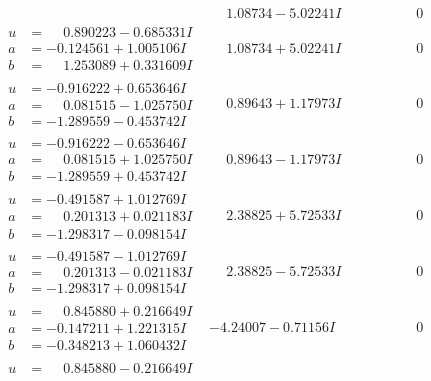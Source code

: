 \documentclass[1p]{elsarticle_modified}
\theoremstyle{definition}
\begin{document}
$$\begin{array}{c|c|c}
 & \phantom{-}1.08734 - 5.02241 I & \phantom{-0.000000 } 0 \\ \hline\begin{aligned}
u &= \phantom{-}0.890223 - 0.685331 I \\
a &= -0.124561 + 1.005106 I \\
b &= \phantom{-}1.253089 + 0.331609 I\end{aligned}
 & \phantom{-}1.08734 + 5.02241 I & \phantom{-0.000000 } 0 \\ \hline\begin{aligned}
u &= -0.916222 + 0.653646 I \\
a &= \phantom{-}0.081515 - 1.025750 I \\
b &= -1.289559 - 0.453742 I\end{aligned}
 & \phantom{-}0.89643 + 1.17973 I & \phantom{-0.000000 } 0 \\ \hline\begin{aligned}
u &= -0.916222 - 0.653646 I \\
a &= \phantom{-}0.081515 + 1.025750 I \\
b &= -1.289559 + 0.453742 I\end{aligned}
 & \phantom{-}0.89643 - 1.17973 I & \phantom{-0.000000 } 0 \\ \hline\begin{aligned}
u &= -0.491587 + 1.012769 I \\
a &= \phantom{-}0.201313 + 0.021183 I \\
b &= -1.298317 - 0.098154 I\end{aligned}
 & \phantom{-}2.38825 + 5.72533 I & \phantom{-0.000000 } 0 \\ \hline\begin{aligned}
u &= -0.491587 - 1.012769 I \\
a &= \phantom{-}0.201313 - 0.021183 I \\
b &= -1.298317 + 0.098154 I\end{aligned}
 & \phantom{-}2.38825 - 5.72533 I & \phantom{-0.000000 } 0 \\ \hline\begin{aligned}
u &= \phantom{-}0.845880 + 0.216649 I \\
a &= -0.147211 + 1.221315 I \\
b &= -0.348213 + 1.060432 I\end{aligned}
 & -4.24007 - 0.71156 I & \phantom{-0.000000 } 0 \\ \hline\begin{aligned}
u &= \phantom{-}0.845880 - 0.216649 I \\

\end{aligned}
\end{array}$$
\end{document}
